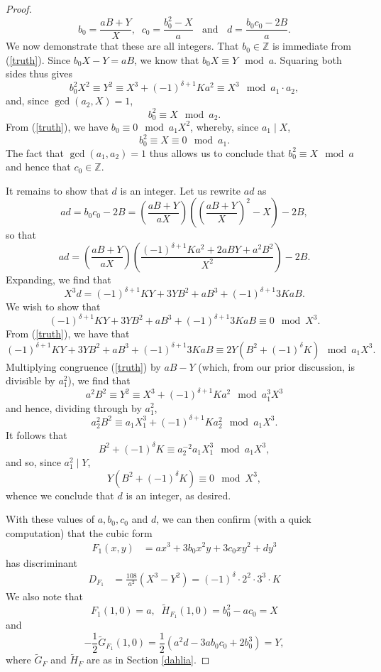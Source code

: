 \documentclass[11pt]{report}
\theoremstyle{definition}
\begin{document}
\begin{proof}
\begin{equation} \label{definite}
b_0 = \frac{aB+Y}{X}, \; \;
c_0 = \frac{b_0^2-X}{a} \; \; \mbox{ and } \; \;
d = \frac{b_0c_0 - 2B}{a}.
\end{equation}
We now demonstrate that these are all integers. That $b_0 \in \mathbb{Z}$ is immediate from (\ref{truth}).
Since $b_0 X - Y = aB$, we know that $b_0 X \equiv Y \mod{a}$. Squaring both sides
thus gives
$$
b_0^2 X^2 \equiv Y^2 \equiv X^3 + (-1)^{\delta+1} K a^2  \equiv X^3 \mod{a_1 \cdot a_2},
$$
and, since $\gcd (a_2,X)=1$,
$$
 b_0^2 \equiv X \mod{a_2}.
$$
From (\ref{truth}), we have $b_0 \equiv 0 \mod{a_1 X^2}$, whereby, since $a_1 \mid X$,
$$
b_0^2 \equiv X \equiv 0 \mod{a_1}.
$$
The fact that $\gcd(a_1,a_2)=1$ thus allows us to conclude that $b_0^2 \equiv X \mod{a}$ and hence that $c_0 \in \mathbb{Z}$.

It remains to show that $d$ is an integer.
Let us rewrite $ad$ as
$$
ad = b_0c_0-2B = \left( \frac{aB+Y}{aX} \right) \left( \left( \frac{aB+Y}{X} \right)^2 - X \right) - 2B,
$$
so that
$$
ad =\left( \frac{aB+Y}{aX} \right) \left( \frac{(-1)^{\delta+1} K a^2 + 2 a B Y + a^2 B^2}{X^2} \right) - 2B.
$$
Expanding, we find that
\begin{equation} \label{three}
X^3 d = (-1)^{\delta+1} KY+ 3 Y B^2 + a B^3 + (-1)^{\delta+1} 3 KaB.
\end{equation}
We wish to show that
$$
(-1)^{\delta+1} KY+ 3 Y B^2 + a B^3 + (-1)^{\delta+1} 3 KaB \equiv 0 \mod{X^3}.
$$
From (\ref{truth}), we have that
$$
(-1)^{\delta+1} KY+ 3 Y B^2 + a B^3 + (-1)^{\delta+1} 3 KaB \equiv 2Y \left( B^2 + (-1)^\delta K \right) \mod{a_1 X^3}.
$$
Multiplying congruence (\ref{truth}) by $aB-Y$ (which, from our prior discussion, is divisible by $a_1^2$),
we find that
$$
a^2 B^2 \equiv Y^2 \equiv X^3 + (-1)^{\delta+1} K a^2 \mod{a_1^3 X^3}
$$
and hence, dividing through by $a_1^2$,
$$
a_2^2 B^2 \equiv  a_1 X_1^3 + (-1)^{\delta+1} K a_2^2 \mod{a_1 X^3}.
$$
It follows that
\begin{equation} \label{three-2}
B^2 + (-1)^\delta K \equiv a_2^{-2} a_1 X_1^3  \mod{a_1 X^3},
\end{equation}
and so, since $a_1^2 \mid Y$,
$$
Y \left( B^2 + (-1)^\delta K \right) \equiv 0 \mod{X^3},
$$
whence we conclude that $d$ is an integer, as desired.

With these values of $a, b_0, c_0$ and $d$, we can then confirm (with a quick computation) that the cubic form
\begin{align*}
  F_1(x,y) &= ax^3 + 3b_0 x^2y + 3c_0 xy^2 + dy^3
\end{align*}
has discriminant
\begin{align*}
  D_{F_1} &= \frac{108}{a^2} (X^3-Y^2) = (-1)^\delta \cdot 2^2 \cdot 3^3 \cdot K
\end{align*}
We also note that
$$
F_1(1,0) = a, \; \; \widetilde{H}_{F_1}(1,0) = b_0^2 -a c_0 = X
$$
and
$$
 -\frac{1}{2} \widetilde{G}_{F_1}(1,0) = \frac{1}{2}(a^2d -3ab_0c_0+2b_0^3) = Y,
$$
where $\widetilde{G}_{F}$ and $\widetilde{H}_{F}$ are as in Section \ref{dahlia}.


\end{proof}
\end{document}
